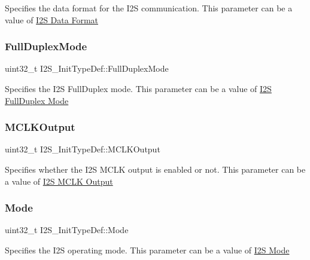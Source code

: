 Specifies the data format for the I2S communication. This parameter can be a value of \hyperlink{group___i2_s___data___format}{I2S Data Format} \mbox{\label{struct_i2_s___init_type_def_a3126fcf92721ac72c91cc870fcef1ffe}} 
\subsubsection{\texorpdfstring{Full\+Duplex\+Mode}{FullDuplexMode}}
{\footnotesize\ttfamily uint32\+\_\+t I2\+S\+\_\+\+Init\+Type\+Def\+::\+Full\+Duplex\+Mode}

Specifies the I2S Full\+Duplex mode. This parameter can be a value of \hyperlink{group___i2_s___full_duplex___mode}{I2S Full\+Duplex Mode} \mbox{\label{struct_i2_s___init_type_def_ad0d868889f53bdda32fa5c201efa2a12}} 
\subsubsection{\texorpdfstring{M\+C\+L\+K\+Output}{MCLKOutput}}
{\footnotesize\ttfamily uint32\+\_\+t I2\+S\+\_\+\+Init\+Type\+Def\+::\+M\+C\+L\+K\+Output}

Specifies whether the I2S M\+C\+LK output is enabled or not. This parameter can be a value of \hyperlink{group___i2_s___m_c_l_k___output}{I2S M\+C\+LK Output} \mbox{\label{struct_i2_s___init_type_def_abcd2a46537eee4ed23fa1642c5234ea8}} 
\subsubsection{\texorpdfstring{Mode}{Mode}}
{\footnotesize\ttfamily uint32\+\_\+t I2\+S\+\_\+\+Init\+Type\+Def\+::\+Mode}

Specifies the I2S operating mode. This parameter can be a value of \hyperlink{group___i2_s___mode}{I2S Mode} \mbox{\label{struct_i2_s___init_type_def_a8fc84bad7ae403ab4231b37077f9d99f}} 
